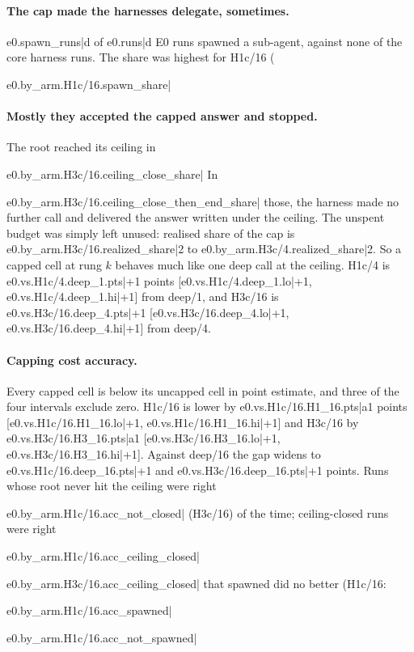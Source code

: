 \documentclass[11pt]{article}
\begin{document}
{{{{{{{{{{{{\paragraph{The cap made the harnesses delegate, sometimes.} {{e0.spawn_runs|d}} of {{e0.runs|d}} E0 runs
spawned a sub-agent, against none of the core harness runs. The share was highest for H1c/16
({{e0.by_arm.H1c/16.spawn_share|%

\paragraph{Mostly they accepted the capped answer and stopped.} The root reached its ceiling in
{{e0.by_arm.H3c/16.ceiling_close_share|%
In {{e0.by_arm.H3c/16.ceiling_close_then_end_share|%
those, the harness made no further call and delivered the answer written under the ceiling. The unspent budget was
simply left unused: realised share of the cap is {{e0.by_arm.H3c/16.realized_share|2}} to
{{e0.by_arm.H3c/4.realized_share|2}}. So a capped cell at rung $k$ behaves much like one deep call at the ceiling. H1c/4 is
{{e0.vs.H1c/4.deep_1.pts|+1}} points [{{e0.vs.H1c/4.deep_1.lo|+1}}, {{e0.vs.H1c/4.deep_1.hi|+1}}] from deep/1, and
H3c/16 is {{e0.vs.H3c/16.deep_4.pts|+1}} [{{e0.vs.H3c/16.deep_4.lo|+1}}, {{e0.vs.H3c/16.deep_4.hi|+1}}] from deep/4.

\paragraph{Capping cost accuracy.} Every capped cell is below its uncapped cell in point estimate, and three of the four intervals exclude zero. H1c/16 is lower by
{{e0.vs.H1c/16.H1_16.pts|a1}} points [{{e0.vs.H1c/16.H1_16.lo|+1}}, {{e0.vs.H1c/16.H1_16.hi|+1}}] and H3c/16 by
{{e0.vs.H3c/16.H3_16.pts|a1}} [{{e0.vs.H3c/16.H3_16.lo|+1}}, {{e0.vs.H3c/16.H3_16.hi|+1}}]. Against deep/16 the gap
widens to {{e0.vs.H1c/16.deep_16.pts|+1}} and {{e0.vs.H3c/16.deep_16.pts|+1}} points. Runs whose root never hit
the ceiling were right {{e0.by_arm.H1c/16.acc_not_closed|%
(H3c/16) of the time; ceiling-closed runs were right {{e0.by_arm.H1c/16.acc_ceiling_closed|%
{{e0.by_arm.H3c/16.acc_ceiling_closed|%
that spawned did no better (H1c/16: {{e0.by_arm.H1c/16.acc_spawned|%
{{e0.by_arm.H1c/16.acc_not_spawned|%

}}}}}}}}}}}}}}}}}}}}}}}}}}}}
\end{document}
